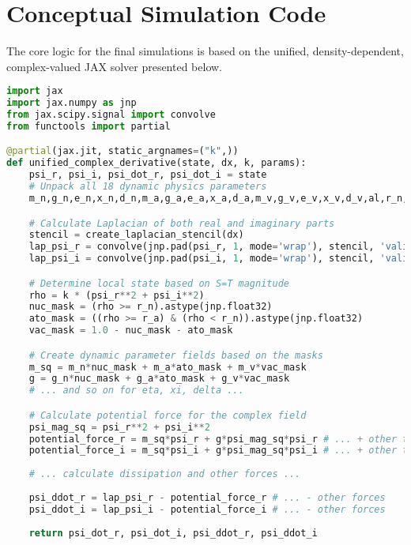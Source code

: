 \documentclass[11pt]{article}
\begin{document}
\section{Conceptual Simulation Code}
The core logic for the final simulations is based on the unified, density-dependent, complex-valued JAX solver presented below.

\begin{lstlisting}[language=Python, caption=Conceptual Unified Field Chemistry Solver]
import jax
import jax.numpy as jnp
from jax.scipy.signal import convolve
from functools import partial

@partial(jax.jit, static_argnames=("k",))
def unified_complex_derivative(state, dx, k, params):
    psi_r, psi_i, psi_dot_r, psi_dot_i = state
    # Unpack all 18 dynamic physics parameters
    m_n,g_n,e_n,x_n,d_n,m_a,g_a,e_a,x_a,d_a,m_v,g_v,e_v,x_v,d_v,al,r_n,r_a = params

    # Calculate Laplacian of both real and imaginary parts
    stencil = create_laplacian_stencil(dx)
    lap_psi_r = convolve(jnp.pad(psi_r, 1, mode='wrap'), stencil, 'valid')
    lap_psi_i = convolve(jnp.pad(psi_i, 1, mode='wrap'), stencil, 'valid')

    # Determine local state based on S=T magnitude
    rho = k * (psi_r**2 + psi_i**2)
    nuc_mask = (rho >= r_n).astype(jnp.float32)
    ato_mask = ((rho >= r_a) & (rho < r_n)).astype(jnp.float32)
    vac_mask = 1.0 - nuc_mask - ato_mask

    # Create dynamic parameter fields based on the masks
    m_sq = m_n*nuc_mask + m_a*ato_mask + m_v*vac_mask
    g = g_n*nuc_mask + g_a*ato_mask + g_v*vac_mask
    # ... and so on for eta, xi, delta ...

    # Calculate potential force for the complex field
    psi_mag_sq = psi_r**2 + psi_i**2
    potential_force_r = m_sq*psi_r + g*psi_mag_sq*psi_r # ... + other terms
    potential_force_i = m_sq*psi_i + g*psi_mag_sq*psi_i # ... + other terms
    
    # ... calculate dissipation and other forces ...
    
    psi_ddot_r = lap_psi_r - potential_force_r # ... - other forces
    psi_ddot_i = lap_psi_i - potential_force_i # ... - other forces
    
    return psi_dot_r, psi_dot_i, psi_ddot_r, psi_ddot_i
\end{lstlisting}
\end{document}
